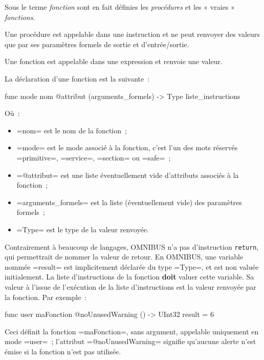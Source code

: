 
Sous le terme \emph{fonction} sont en fait définies les \emph{procédures} et les « vraies » \emph{fonctions}.

Une procédure est appelable dans une instruction et ne peut renvoyer des valeurs que par ses paramètres formels de sortie et d'entrée/sortie.

Une fonction est appelable dans une expression et renvoie une valeur.






La déclaration d'une fonction est la suivante~:
\begin{OMNIBUS}
func mode nom @attribut (arguments_formels) -> Type {
  liste_instructions
}
\end{OMNIBUS}
Où~:
\begin{itemize}
  \item \omnibus=nom= est le nom de la fonction~;
  \item \omnibus=mode= est le mode associé à la fonction, c'est l'un des mots réservés \omnibus=primitive=, \omnibus=service=, \omnibus=section= ou \omnibus=safe=~;
  \item \omnibus=@attribut= est une liste éventuellement vide d'attributs associés à la fonction~;
  \item \omnibus=arguments_formels= est la liste (éventuellement vide) des paramètres formels~;
  \item \omnibus=Type= est le type de la valeur renvoyée.
\end{itemize}

Contrairement à beaucoup de langages, OMNIBUS n'a pas d'instruction \texttt{return}, qui permettrait de nommer la valeur de retour. En OMNIBUS, une variable nommée \omnibus=result= est implicitement déclarée du type \omnibus=Type=, et est non valuée initialement. La liste d'instructions de la fonction {\bf doit} valuer cette variable. Sa valeur à l'issue de l'exécution de la liste d'instructions est la valeur renvoyée par la fonction.
Par exemple~:

\begin{OMNIBUS}
func user maFonction @noUnusedWarning () -> UInt32 {
  result = 6
}
\end{OMNIBUS}

Ceci définit la fonction \omnibus=maFonction=, sans argument, appelable uniquement en mode \omnibus=user=~; l'attribut \omnibus=@noUnusedWarning= signifie qu'aucune alerte n'est émise si la fonction n'est pas utilisée.

